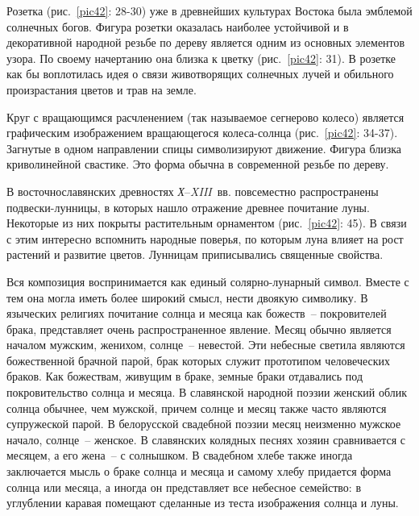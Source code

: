 \documentclass[pscyr,chapters]{hedwork}
\begin{document}
  Розетка (рис.~\ref{pic42}: 28-30) уже в древнейших культурах Востока была
  эмблемой солнечных богов. Фигура розетки оказалась наиболее устойчивой и в
  декоративной народной резьбе по дереву является одним из основных элементов
  узора. По своему начертанию она близка к цветку (рис.~\ref{pic42}: 31). В
  розетке как бы воплотилась идея о связи животворящих солнечных лучей и
  обильного произрастания цветов и трав на земле.

  Круг с вращающимся расчленением (так называемое сегнерово колесо) является
  графическим изображением вращающегося колеса-солнца (рис.~\ref{pic42}: 34-37).
  Загнутые в одном направлении спицы символизируют движение. Фигура близка
  криволинейной свастике. Это форма обычна в современной резьбе по дереву.

  В восточнославянских древностях \emph{Х}--\emph{XIII}~вв. повсеместно
  распространены подвески-лунницы, в которых нашло отражение древнее почитание
  луны. Некоторые из них покрыты растительным орнаментом (рис.~\ref{pic42}: 45).
  В связи с этим интересно вспомнить народные поверья, по которым луна влияет на
  рост растений и развитие цветов. Лунницам приписывались священные свойства.

  Вся композиция воспринимается как единый солярно-лунарный символ. Вместе с тем
  она могла иметь более широкий смысл, нести двоякую символику. В языческих
  религиях почитание солнца и месяца как божеств~-- покровителей брака,
  представляет очень распространенное явление. Месяц обычно является началом
  мужским, женихом, солнце~-- невестой. Эти небесные светила являются
  божественной брачной парой, брак которых служит прототипом человеческих
  браков. Как божествам, живущим в браке, земные браки отдавались под
  покровительство солнца и месяца. В славянской народной поэзии женский облик
  солнца обычнее, чем мужской, причем солнце и месяц также часто являются
  супружеской парой. В белорусской свадебной поэзии месяц неизменно мужское
  начало, солнце~-- женское. В славянских колядных песнях хозяин сравнивается с
  месяцем, а его жена~-- с солнышком. В свадебном хлебе также иногда заключается
  мысль о браке солнца и месяца и самому хлебу придается форма солнца или
  месяца, а иногда он представляет все небесное семейство: в углублении каравая
  помещают сделанные из теста изображения солнца и луны.
\end{document}
